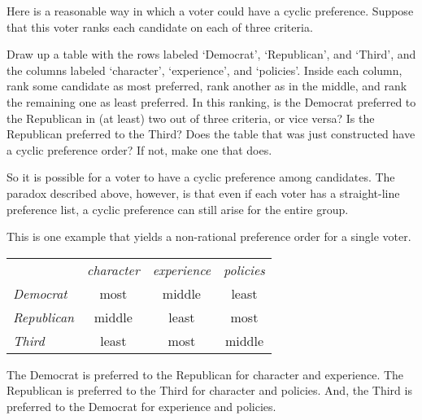 \begin{exercises}
  \item \label{IrrIndVote}
    Here is a reasonable way in which a voter could have a cyclic preference.
    Suppose that this voter ranks each candidate
    on each of three criteria.
    \begin{exparts}
      \partsitem Draw up a table with the rows labeled `Democrat',
         `Republican', and `Third', and the columns labeled
         `character', `experience', and `policies'.
         Inside each column, rank some 
         candidate as most preferred, 
         rank another as in the middle, and rank the remaining one
         as least preferred.
      \partsitem In this ranking, is the Democrat preferred to the Republican
         in (at least) two out of three criteria, or vice versa?
         Is the Republican preferred to the Third?
      \partsitem  Does the table that was 
         just constructed have a cyclic preference order?
         If not, make one that does.
    \end{exparts}
    So it is possible for a voter to have a cyclic preference among candidates.
    The paradox described above, however, is that even if each voter has a
    straight-line preference list, 
    a cyclic preference can still arise for the entire group. 
    \begin{answer}
      This is one example that yields a non-rational preference order for a 
      single voter.
      \begin{center}
        \begin{tabular}{l|c|c|c|}
             \multicolumn{1}{c}{\ }
                  &\multicolumn{1}{c}{\textit{character}}
                  &\multicolumn{1}{c}{\textit{experience}}
                  &\multicolumn{1}{c}{\textit{policies}}   \\ 
          \cline{2-4}
         \textit{Democrat}   &most    &middle  &least   \\
         \textit{Republican} &middle  &least   &most    \\
         \textit{Third}      &least   &most    &middle  \\
          \cline{2-4}
        \end{tabular}
      \end{center}
      The Democrat is preferred to the Republican for character and
      experience.
      The Republican is preferred to the Third for character and policies.
      And, the Third is preferred to the Democrat for experience and policies.
    \end{answer}

\end{exercises}
